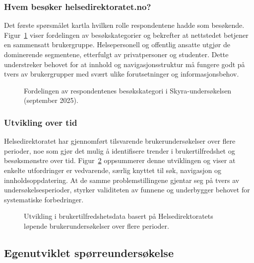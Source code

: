 \subsubsection{Hvem besøker helsedirektoratet.no?}
\label{sec:hvem-besoker}

Det første spørsmålet kartla hvilken rolle respondentene hadde som besøkende. Figur~\ref{fig:undersokelse-hvem} viser fordelingen av besøkskategorier og bekrefter at nettstedet betjener en sammensatt brukergruppe. Helsepersonell og offentlig ansatte utgjør de dominerende segmentene, etterfulgt av privatpersoner og studenter. Dette understreker behovet for at innhold og navigasjonsstruktur må fungere godt på tvers av brukergrupper med svært ulike forutsetninger og informasjonsbehov.

\begin{figure}[H]
    \centering
    
    \caption{Fordelingen av respondentenes besøkskategori i Skyra-undersøkelsen (september 2025).}
    \label{fig:undersokelse-hvem}
\end{figure}

\subsubsection{Utvikling over tid}
\label{sec:utvikling-over-tid}

Helsedirektoratet har gjennomført tilsvarende brukerundersøkelser over flere perioder, noe som gjør det mulig å identifisere trender i brukertilfredshet og besøksmønstre over tid. Figur~\ref{fig:undersokelse-over-tid} oppsummerer denne utviklingen og viser at enkelte utfordringer er vedvarende, særlig knyttet til søk, navigasjon og innholdsoppdatering. At de samme problemstillingene gjentar seg på tvers av undersøkelsesperioder, styrker validiteten av funnene og underbygger behovet for systematiske forbedringer.

\begin{figure}[H]
    \centering
    
    \caption{Utvikling i brukertilfredshetsdata basert på Helsedirektoratets løpende brukerundersøkelser over flere perioder.}
    \label{fig:undersokelse-over-tid}
\end{figure}

\subsection{Egenutviklet spørreundersøkelse}
\label{sec:egen-undersokelse}


